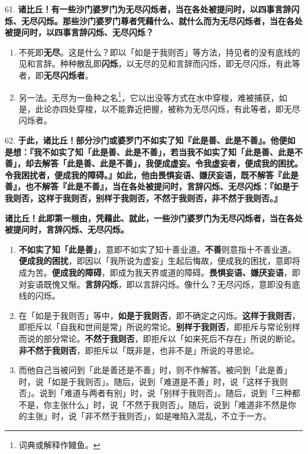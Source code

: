 {\Large 61.} \textbf{诸比丘！有一些沙门婆罗门为无尽闪烁者，当在各处被提问时，以四事言辞闪烁、无尽闪烁。那些沙门婆罗门尊者凭藉什么、就什么而为无尽闪烁者，当在各处被提问时，以四事言辞闪烁、无尽闪烁？}

\begin{enumerate}\item 不死即\textbf{无尽}。这是什么？即以「如是于我则否」等方法，持见者的没有底线的见和言辞。种种散乱即\textbf{闪烁}，以无尽的见和言辞而闪烁，即无尽闪烁，有此等者，即\textbf{无尽闪烁者}。
\item 另一法。无尽为一鱼种之名\footnote{词典或解释作鳗鱼。}，它以出没等方式在水中穿梭，难被捕获，如是，此论亦四处穿梭，以不能靠近把握，被称为无尽闪烁，有此等者，即无尽闪烁者。\end{enumerate}

{\Large 62.} \textbf{于此，诸比丘！部分沙门或婆罗门不如实了知『此是善、此是不善』。他便如是想：『我不如实了知「此是善、此是不善」，若当我不如实了知「此是善、此是不善」，却去解答「此是善、此是不善」，我便成虚妄。令我虚妄者，便成我的困扰。令我困扰者，便成我的障碍。』如此，他由畏惧妄语、嫌厌妄语，既不解答『此是善』，也不解答『此是不善』，当在各处被提问时，言辞闪烁、无尽闪烁：『如是于我则否，这样于我则否，别样于我则否，不然于我则否，非不然于我则否。』}

\textbf{诸比丘！此即第一根由，凭藉此、就此，一些沙门婆罗门为无尽闪烁者，当在各处被提问时，言辞闪烁、无尽闪烁。}

\begin{enumerate}\item \textbf{不如实了知「此是善」}，意即不如实了知十善业道。\textbf{不善}则意指十不善业道。\textbf{便成我的困扰}，即因以「我所说为虚妄」生起后悔故，便成我的困扰，意即将成为苦。\textbf{便成我的障碍}，即成为我天界或道的障碍。\textbf{畏惧妄语、嫌厌妄语}，即对妄语既愧又惭。\textbf{言辞闪烁}，即以言辞闪烁。像什么？无尽闪烁，意即没有底线的闪烁。
\item 在「如是于我则否」等中，\textbf{如是于我则否}，即不确定之闪烁。\textbf{这样于我则否}，即拒斥以「自我和世间是常」所说的常论。\textbf{别样于我则否}，即拒斥与常论别样而说的部分常论。\textbf{不然于我则否}，即拒斥以「如来死后不存在」所说的断论。\textbf{非不然于我则否}，即拒斥以「既非是，也非不是」所说的寻思论。
\item 而他自己当被问到「此是善还是不善」时，则不作解答。被问到「此是善」时，说「如是于我则否」。随后，说到「难道是不善」时，说「这样于我则否」。说到「难道与两者有别」时，说「别样于我则否」。随后，说到「三种都不是，你主张什么」时，说「不然于我则否」。随后，说到「难道非不然是你的主张」时，说「非不然于我则否」，如是唯陷入混乱，不立于一方。\end{enumerate}

